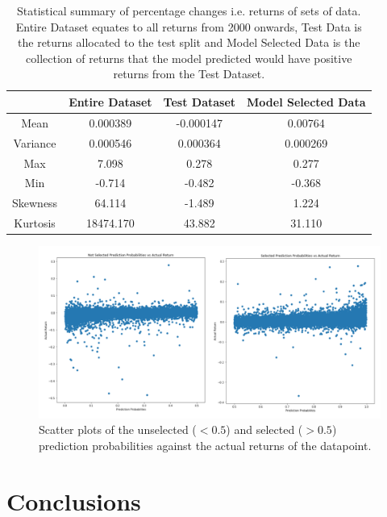 \documentclass[10pt,onecolumn,letterpaper]{article}
\begin{document}
\begin{table}[hbt!]
\begin{center}
\begin{tabular}{c|c|c|c}
 & Entire Dataset & Test Dataset & Model Selected Data\\
\hline
Mean & 0.000389 & -0.000147 & 0.00764\\
\hline
Variance & 0.000546 & 0.000364 & 0.000269\\
\hline
Max & 7.098 & 0.278 & 0.277\\
\hline
Min & -0.714 & -0.482 & -0.368\\
\hline
Skewness & 64.114 & -1.489 & 1.224\\
\hline
Kurtosis & 18474.170 & 43.882 & 31.110\\
\end{tabular}
\end{center}
\caption{Statistical summary of percentage changes i.e. returns of sets of data. Entire Dataset equates to all returns from 2000 onwards, Test Data is the returns allocated to the test split and Model Selected Data is the collection of returns that the model predicted would have positive returns from the Test Dataset.}
\label{benchmarkstats}
\end{table}

\begin{figure}[!hbt!]
\centering
\includegraphics[width=16.5cm]{prob_vs_returns.png}
\caption{Scatter plots of the unselected ($<0.5$) and selected ($>0.5$) prediction probabilities against the actual returns of the datapoint.}
\label{probsvsreturns}
\end{figure}


\clearpage

\section{Conclusions}
\end{document}
